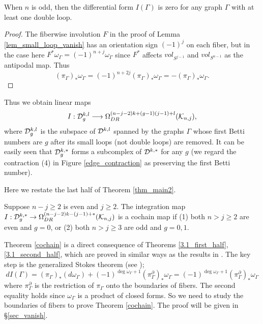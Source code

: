 \begin{lem}\label{lem_double_loop_vanish}
When $n$ is odd, then the differential form $I(\Gamma )$ is zero for any graph $\Gamma$ with at least one double loop.
\end{lem}


\begin{proof}
The fiberwise involution $F$ in the proof of Lemma \ref{lem_small_loop_vanish} has an orientation sign $(-1)^j$ on each
fiber, but in the case here $F^* \omega_{\Gamma}=(-1)^{n+j}\omega_{\Gamma}$ since $F^*$ affects $vol_{S^{j-1}}$ and
$vol_{S^{n-1}}$ as the antipodal map.
Thus
\[
 (\pi_{\Gamma})_* \omega_{\Gamma} = (-1)^{n+2j}(\pi_{\Gamma})_* \omega_{\Gamma}
 = -(\pi_{\Gamma})_* \omega_{\Gamma}.
\]
\end{proof}


Thus we obtain linear maps
\[
 I : \mathcal{D}^{k,l}_g \longrightarrow \Omega^{(n-j-2)k+(g-1)(j-1)+l}_{DR}(\mathcal{K}_{n ,j}),
\]
where $\mathcal{D}^{k,l}_g$ is the subspace of $\mathcal{D}^{k,l}$ spanned by the graphs $\Gamma$ whose first Betti numbers are $g$
after its small loops (not double loops) are removed.
It can be easily seen that $\mathcal{D}^{k,*}_g$ forms a subcomplex of $\mathcal{D}^{k,*}$ for any $g$ (we regard the contraction (4)
in Figure \ref{edge_contraction} as preserving the first Betti number).


Here we restate the last half of Theorem \ref{thm_main2}.


\begin{thm}\label{cochain}
Suppose $n-j\ge 2$ is even and $j \ge 2$.
The integration map $I : \mathcal{D}^{k,*}_g \to \Omega^{(n-j-2)k-(j-1)+*}_{DR}(\mathcal{K}_{n ,j})$ is a cochain map if
(1) both $n>j \ge 2$ are even and $g=0$, or (2) both $n > j \ge 3$ are odd and $g=0,1$.
\end{thm}


Theorem \ref{cochain} is a direct consequence of Theorems \ref{3.1_first_half}, \ref{3.1_second_half}, which are
proved in similar ways as the results in \cite{CCL02, Rossi_thesis, Watanabe07}.
The key step is the generalized Stokes theorem (see \cite{CCL02});
\[
 dI(\Gamma ) = (\pi_{\Gamma})_* (d\omega_{\Gamma})
 +(-1)^{\deg \omega_{\Gamma }+1} (\pi^{\partial}_{\Gamma})_* \omega_{\Gamma} 
 = (-1)^{\deg \omega_{\Gamma }+1} (\pi^{\partial}_{\Gamma})_* \omega_{\Gamma}
\]
where $\pi^{\partial}_{\Gamma}$ is the restriction of $\pi_{\Gamma}$ onto the boundaries of fibers.
The second equality holds since $\omega_{\Gamma}$ is a product of closed forms.
So we need to study the boundaries of fibers to prove Theorem \ref{cochain}.
The proof will be given in \S \ref{sec_vanish}.


